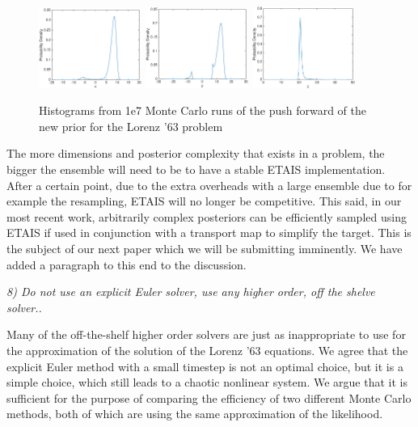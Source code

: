 \documentclass{article}
\newcommand{\comment}[2]{\vspace{0.6cm}{\bf Comment:} {\it #1.}

\vspace{0.3cm}{\bf Answer:} #2}
\begin{document}
{\begin{figure}[htp]
\includegraphics[width=0.3\textwidth]{figures/xhist}
\includegraphics[width=0.3\textwidth]{figures/yhist}
\includegraphics[width=0.3\textwidth]{figures/zhist}
\caption{Histograms from 1e7 Monte Carlo runs of the push forward of the new prior for the Lorenz '63 problem}
\end{figure}

The more dimensions and posterior complexity that exists in a problem, the bigger the ensemble will need to be to have a stable ETAIS implementation. After a certain point, due to the extra overheads with a large ensemble due to for example the resampling, ETAIS will no longer be competitive. This said, in our most recent work, arbitrarily complex posteriors can be efficiently sampled using ETAIS if used in conjunction with a transport map to simplify the target. This is the subject of our next paper which we will be submitting imminently. We have added a paragraph to this end to the discussion.}


  \comment{8) Do not use an explicit Euler solver, use any higher order, off the shelve solver.}{Many of the off-the-shelf higher order solvers are just as inappropriate to use for the approximation of the solution of the Lorenz '63 equations. We agree that the explicit Euler method with a small timestep is not an optimal choice, but it is a simple choice, which still leads to a chaotic nonlinear system. We argue that it is sufficient for the purpose of comparing the efficiency of two different Monte Carlo methods, both of which are using the same approximation of the likelihood.}
\end{document}
